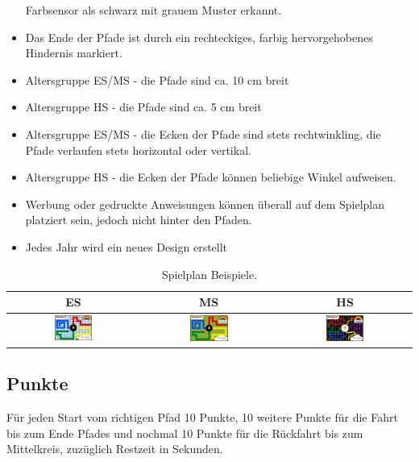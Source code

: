 \documentclass[a4paper,12pt]{article}
\begin{document}
\begin{itemize}
		Farbsensor als schwarz mit grauem Muster erkannt.
	\item Das Ende der Pfade ist durch ein rechteckiges, farbig
		hervorgehobenes Hindernis markiert.
	\item Altersgruppe ES/MS - die Pfade sind ca. 10 cm breit
	\item Altersgruppe HS - die Pfade sind ca. 5 cm breit
	\item Altersgruppe ES/MS - die Ecken der Pfade sind stets
		rechtwinkling, die Pfade verlaufen stets horizontal oder
		vertikal.
	\item Altersgruppe HS - die Ecken der Pfade können beliebige Winkel
		aufweisen.
	\item Werbung oder gedruckte Anweisungen können überall auf dem
		Spielplan platziert sein, jedoch nicht hinter den Pfaden.
	\item Jedes Jahr wird ein neues Design erstellt
\end{itemize}

\begin{center}
\begin{table}
	\begin{tabular}{|c|c|c|} \hline
		ES & MS & HS \\
		\hline
\includegraphics[width=0.3\textwidth]{images/cyberspace/rainbow_es.png}
&
\includegraphics[width=0.3\textwidth]{images/cyberspace/rainbow_ms.png}
&
\includegraphics[width=0.3\textwidth]{images/cyberspace/rainbow_hs.png}
\\
    		\hline
	\end{tabular}
\caption{\label{tab:table-name}Spielplan Beispiele.}
\end{table}
\end{center}

\subsection{Punkte}

Für jeden Start vom richtigen Pfad 10 Punkte, 10 weitere Punkte für die Fahrt
bis zum Ende Pfades und nochmal 10 Punkte für die Rückfahrt bis zum
Mittelkreis, zuzüglich Restzeit in Sekunden.
\end{document}
